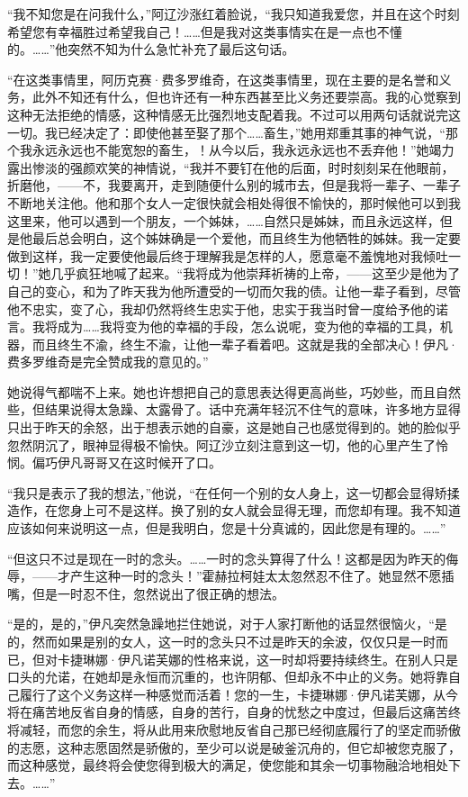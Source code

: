\par “我不知您是在问我什么，”阿辽沙涨红着脸说，“我只知道我爱您，并且在这个时刻希望您有幸福胜过希望我自己！……但是我对这类事情实在是一点也不懂的。……”他突然不知为什么急忙补充了最后这句话。
\par “在这类事情里，阿历克赛·费多罗维奇，在这类事情里，现在主要的是名誉和义务，此外不知还有什么，但也许还有一种东西甚至比义务还要崇高。我的心觉察到这种无法拒绝的情感，这种情感无比强烈地支配着我。不过可以用两句话就说完这一切。我已经决定了：即使他甚至娶了那个……畜生，”她用郑重其事的神气说，“那个我永远永远也不能宽恕的畜生，！从今以后，我永远永远也不丢弃他！”她竭力露出惨淡的强颜欢笑的神情说，“我并不要钉在他的后面，时时刻刻呆在他眼前，折磨他，——不，我要离开，走到随便什么别的城市去，但是我将一辈子、一辈子不断地关注他。他和那个女人一定很快就会相处得很不愉快的，那时候他可以到我这里来，他可以遇到一个朋友，一个姊妹，……自然只是姊妹，而且永远这样，但是他最后总会明白，这个姊妹确是一个爱他，而且终生为他牺牲的姊妹。我一定要做到这样，我一定要使他最后终于理解我是怎样的人，愿意毫不羞愧地对我倾吐一切！”她几乎疯狂地喊了起来。“我将成为他崇拜祈祷的上帝，——这至少是他为了自己的变心，和为了昨天我为他所遭受的一切而欠我的债。让他一辈子看到，尽管他不忠实，变了心，我却仍然将终生忠实于他，忠实于我当时曾一度给予他的诺言。我将成为……我将变为他的幸福的手段，怎么说呢，变为他的幸福的工具，机器，而且终生不渝，终生不渝，让他一辈子看着吧。这就是我的全部决心！伊凡·费多罗维奇是完全赞成我的意见的。”
\par 她说得气都喘不上来。她也许想把自己的意思表达得更高尚些，巧妙些，而且自然些，但结果说得太急躁、太露骨了。话中充满年轻沉不住气的意味，许多地方显得只出于昨天的余怒，出于想表示她的自豪，这是她自己也感觉得到的。她的脸似乎忽然阴沉了，眼神显得极不愉快。阿辽沙立刻注意到这一切，他的心里产生了怜悯。偏巧伊凡哥哥又在这时候开了口。
\par “我只是表示了我的想法，”他说，“在任何一个别的女人身上，这一切都会显得矫揉造作，在您身上可不是这样。换了别的女人就会显得无理，而您却有理。我不知道应该如何来说明这一点，但是我明白，您是十分真诚的，因此您是有理的。……”
\par “但这只不过是现在一时的念头。……一时的念头算得了什么！这都是因为昨天的侮辱，——才产生这种一时的念头！”霍赫拉柯娃太太忽然忍不住了。她显然不愿插嘴，但是一时忍不住，忽然说出了很正确的想法。
\par “是的，是的，”伊凡突然急躁地拦住她说，对于人家打断他的话显然很恼火，“是的，然而如果是别的女人，这一时的念头只不过是昨天的余波，仅仅只是一时而已，但对卡捷琳娜·伊凡诺芙娜的性格来说，这一时却将要持续终生。在别人只是口头的允诺，在她却是永恒而沉重的，也许阴郁、但却永不中止的义务。她将靠自己履行了这个义务这样一种感觉而活着！您的一生，卡捷琳娜·伊凡诺芙娜，从今将在痛苦地反省自身的情感，自身的苦行，自身的忧愁之中度过，但最后这痛苦终将减轻，而您的余生，将从此用来欣慰地反省自己那已经彻底履行了的坚定而骄傲的志愿，这种志愿固然是骄傲的，至少可以说是破釜沉舟的，但它却被您克服了，而这种感觉，最终将会使您得到极大的满足，使您能和其余一切事物融洽地相处下去。……”
